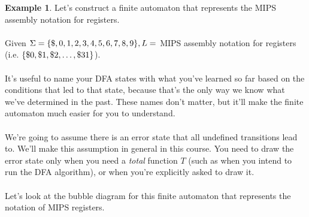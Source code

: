 \documentclass[]{article}
\DeclarePairedDelimiter{\set}{\lbrace}{\rbrace}
\theoremstyle{definition}
\newtheorem{ex}{Example}[section]
\begin{document}
			\begin{ex}
				Let's construct a finite automaton that represents the MIPS assembly notation for registers.
				\\ \\
				Given $\Sigma = \set{\$, 0, 1, 2, 3, 4, 5, 6, 7, 8, 9}, L = $ MIPS assembly notation for registers (i.e. $\set{\$0, \$1, \$2, \ldots, \$31}$).
				\\ \\
				It's useful to name your DFA states with what you've learned so far based on the conditions that led to that state, because that's the only way we know what we've determined in the past. These names don't matter, but it'll make the finite automaton much easier for you to understand.
				\\ \\
				We're going to assume there is an error state that all undefined transitions lead to. We'll make this assumption in general in this course. You need to draw the error state only when you need a \emph{total} function $T$ (such as when you intend to run the DFA algorithm), or when you're explicitly asked to draw it.
				\\ \\
				Let's look at the bubble diagram for this finite automaton that represents the notation of MIPS registers.
				\begin{center}
\end{center}
\end{ex}
\end{document}
